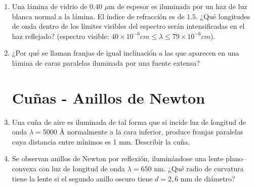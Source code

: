 \documentclass[11pt,spanish,a4paper]{article}
\begin{document}
\begin{enumerate}
\item Una lámina de vidrio de $0.40$ $\mu$m de espesor es iluminada por
un haz de luz blanca normal a la lámina. El índice de refracción es
de $1.5$. ¿Qué longitudes de onda dentro de los límites visibles
del espectro serán intensificadas en el haz reflejado? (espectro visible:
$40\times10^{-6}\unit{cm}\le\lambda\le79\times10^{-6}\unit{cm}$). 


\item ¿Por qué se llaman franjas de igual inclinación a las que aparecen
en una lámina de caras paralelas iluminada por una fuente extensa? 


\section*{Cuñas - Anillos de Newton}

\item Una cuña de aire es iluminada de tal forma que si incide luz de longitud
de onda $\lambda=$5000 Å normalmente a la cara inferior, produce
franjas paralelas cuya distancia entre mínimos es 1 mm. Describir
la cuña. 


\item Se observan anillos de Newton por reflexión, iluminándose una lente
plano--convexa con luz de longitud de onda $\lambda=650$ nm. ¿Qué
radio de curvatura tiene la lente si el segundo anillo oscuro tiene
$d=2,6$ mm de diámetro? 



\end{enumerate}
\end{document}
